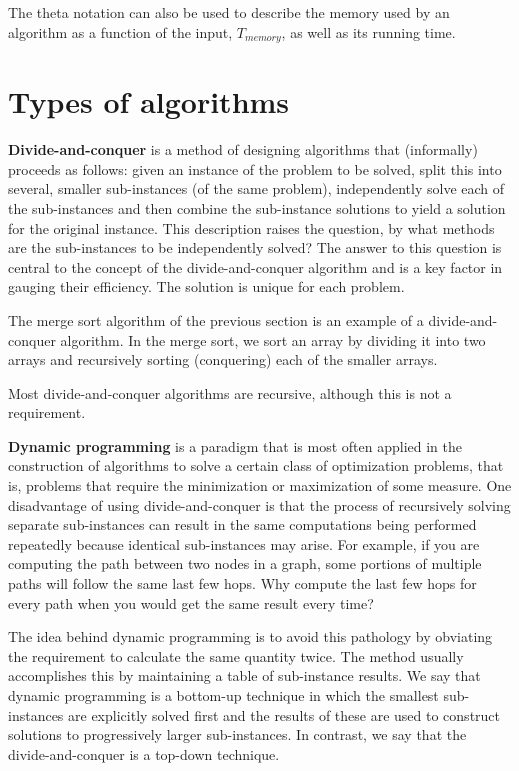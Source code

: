 \documentclass[justified, sixbynine]{tufte-book}
\theoremstyle{plain}%
\newtheorem * {corollary}{Corollary}
\theoremstyle{definition}
\theoremstyle{remark}
\newtheorem * {remark}{Remark}
\newtheorem * {note}{Note}
\begin{document}
\begin{fullwidth}
The theta notation can also be used to describe the memory used by an algorithm as a function of the input, $T_{memory}$, as well as its running time.

\goodbreak\section{Types of algorithms}


{\bf Divide-and-conquer}
 is a method of designing algorithms that
(informally) proceeds as follows: given an instance of the problem to be
solved, split this into several, smaller sub-instances (of the same
problem), independently solve each of the sub-instances and then combine the
sub-instance solutions to yield a solution for the original instance.
This description raises the question, by what methods are the sub-instances
to be independently solved? The answer to this question is central to the
concept of the divide-and-conquer algorithm and is a key factor in gauging
their efficiency. The solution is unique for each problem.

The merge sort algorithm of the previous section is an example of a divide-and-conquer algorithm. In the merge sort, we sort an array by dividing it into two arrays and recursively sorting (conquering) each of the smaller arrays.

Most divide-and-conquer algorithms are recursive, although this is not a requirement.

{\bf Dynamic programming}
is a paradigm that is most often applied in the
construction of algorithms to solve a certain class of optimization
problems, that is, problems that require the minimization or maximization of
some measure. One disadvantage of using divide-and-conquer is that the
process of recursively solving separate sub-instances can result in the same
computations being performed repeatedly because identical sub-instances may
arise. For example, if you are computing the path between two nodes in a graph,
some portions of multiple paths will follow the same last few hops. Why compute
the last few hops for every path when you would get the same result every time?

The idea behind dynamic programming is to avoid this pathology by
obviating the requirement to calculate the same quantity twice. The method
usually accomplishes this by maintaining a table of sub-instance results. We
say that dynamic programming is a bottom-up technique in which the smallest
sub-instances are explicitly solved first and the results of these are used to
construct solutions to progressively larger sub-instances. In contrast, we
say that the divide-and-conquer is a top-down technique.


\end{fullwidth}
\end{document}
